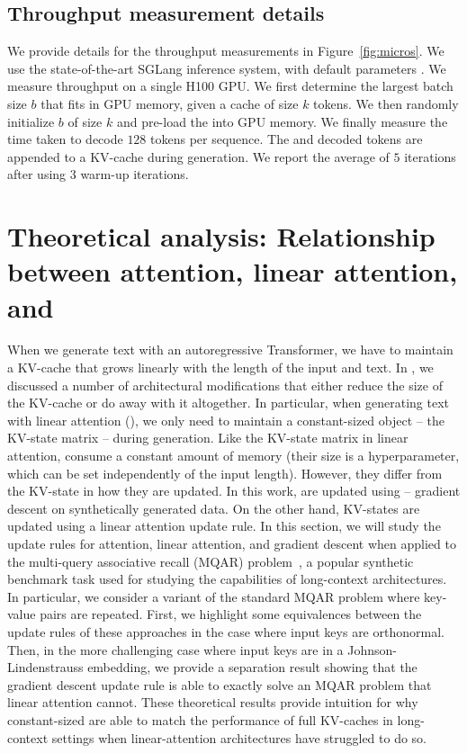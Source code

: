 \subsection{Throughput measurement details}
We provide details for the throughput measurements in Figure~\ref{fig:micros}. We use the state-of-the-art SGLang inference system, with default parameters \cite{zheng2024sglang}. We measure throughput on a single H100 GPU.
We first determine the largest batch size $b$ that fits in GPU memory, given a cache of size $k$ tokens. We then randomly initialize $b$ \artifacts of size $k$ and pre-load the \artifacts into GPU memory. We finally measure the time taken to decode $128$ tokens per sequence. The \artifacts and decoded tokens are appended to a KV-cache during generation. We report the average of $5$ iterations after using $3$ warm-up iterations.



\section{Theoretical analysis: Relationship between attention, linear attention, and \artifacts}
\label{app:theory}
When we generate text with an autoregressive Transformer, we have to maintain a KV-cache that grows linearly with the length of the input and text.
In , we discussed a number of architectural modifications that either reduce the size of the KV-cache or do away with it altogether. In particular, when generating text with linear attention (\eg \cite{arora2024simple}), we only need to maintain a constant-sized object -- the KV-state matrix -- during generation.
Like the KV-state matrix in linear attention, \artifacts consume a constant amount of memory (\ie their size is a hyperparameter, which can be set independently of the input length).
However, they differ from the KV-state in how they are updated. In this work, \artifacts are updated using \method -- gradient descent on synthetically generated data. On the other hand, KV-states are updated using a linear attention update rule.
In this section, we will study the update rules for attention, linear attention, and gradient descent when applied to the multi-query associative recall (MQAR) problem~\cite{arora2023zoologymeasuringimprovingrecall}, a popular synthetic benchmark task used for studying the capabilities of long-context architectures.
In particular, we consider a variant of the standard MQAR problem where key-value pairs are repeated.
First, we highlight some equivalences between the update rules of these approaches in the case where input keys are orthonormal.
Then, in the more challenging case where input keys are in a Johnson-Lindenstrauss embedding, we provide a separation result showing that the gradient descent update rule is able to exactly solve an MQAR problem that linear attention cannot.
These theoretical results provide intuition for why constant-sized \artifacts are able to match the performance of full KV-caches in long-context settings when linear-attention architectures have struggled to do so.
